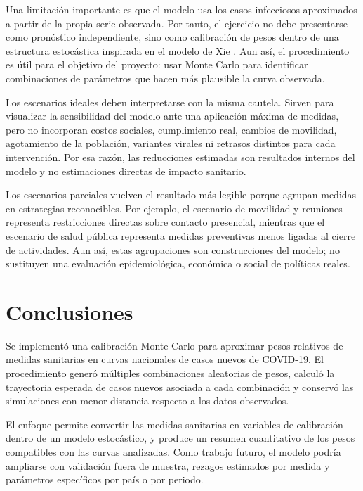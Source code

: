 \documentclass[12pt]{article}
\begin{document}
Una limitación importante es que el modelo usa los casos infecciosos aproximados
a partir de la propia serie observada. Por tanto, el ejercicio no debe
presentarse como pronóstico independiente, sino como calibración de pesos dentro
de una estructura estocástica inspirada en el modelo de Xie \cite{Xie2020}.
Aun así, el procedimiento es útil para el objetivo del proyecto: usar Monte
Carlo para identificar combinaciones de parámetros que hacen más plausible la
curva observada.

Los escenarios ideales deben interpretarse con la misma cautela. Sirven para
visualizar la sensibilidad del modelo ante una aplicación máxima de medidas,
pero no incorporan costos sociales, cumplimiento real, cambios de movilidad,
agotamiento de la población, variantes virales ni retrasos distintos para cada
intervención. Por esa razón, las reducciones estimadas son resultados internos
del modelo y no estimaciones directas de impacto sanitario.

Los escenarios parciales vuelven el resultado más legible porque agrupan medidas
en estrategias reconocibles. Por ejemplo, el escenario de movilidad y reuniones
representa restricciones directas sobre contacto presencial, mientras que el
escenario de salud pública representa medidas preventivas menos ligadas al
cierre de actividades. Aun así, estas agrupaciones son construcciones del
modelo; no sustituyen una evaluación epidemiológica, económica o social de
políticas reales.

\section{Conclusiones}

Se implementó una calibración Monte Carlo para aproximar pesos relativos de
medidas sanitarias en curvas nacionales de casos nuevos de COVID-19. El
procedimiento generó múltiples combinaciones aleatorias de pesos, calculó la
trayectoria esperada de casos nuevos asociada a cada combinación y conservó las
simulaciones con menor distancia respecto a los datos observados.

El enfoque permite convertir las medidas sanitarias en variables de calibración
dentro de un modelo estocástico, y produce un resumen cuantitativo de los pesos
compatibles con las curvas analizadas. Como trabajo futuro, el modelo podría
ampliarse con validación fuera de muestra, rezagos estimados por medida y
parámetros específicos por país o por periodo.

\newpage

\printbibliography
\end{document}
